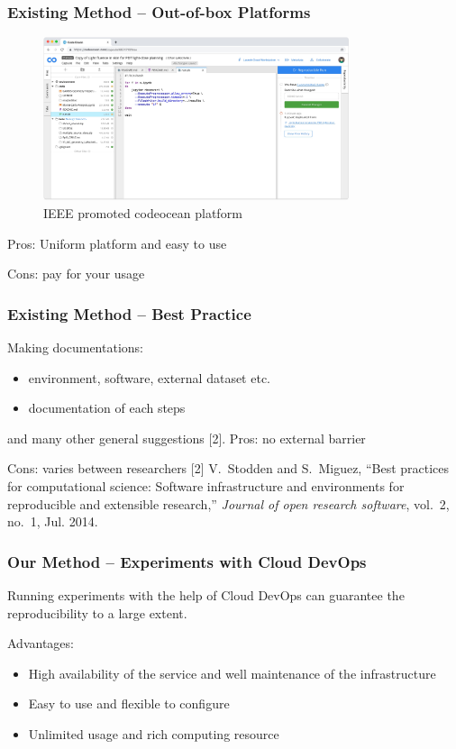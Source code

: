 \documentclass[notheorems]{beamer}
\begin{document}
\begin{frame}
\frametitle{Existing Method -- Out-of-box Platforms}

\begin{figure}
\includegraphics[width=0.8\textwidth]{pic/code_ocean.jpeg}
\caption{IEEE promoted codeocean platform}
\end{figure}
Pros: Uniform platform and easy to use

Cons: pay for your usage
\end{frame}

\begin{frame}
\frametitle{Existing Method -- Best Practice}

Making documentations:
\begin{itemize}
\item environment, software, external dataset etc.
\item documentation of each steps
\end{itemize}
and many other general suggestions [2].
\vskip 0.5cm
Pros: no external barrier

Cons: varies between researchers
\vskip 1cm
{\tiny
[2] V.~Stodden and S.~Miguez, ``Best practices for computational science: Software
  infrastructure and environments for reproducible and extensible research,''
  \emph{Journal of open research software}, vol.~2, no.~1, Jul. 2014.
  }
\end{frame}

\begin{frame}
\frametitle{Our Method -- Experiments with Cloud DevOps}
\begin{block}{}
\begin{centering}
Running experiments with the help of Cloud DevOps can guarantee the reproducibility to a large extent.
\end{centering}
\end{block}
Advantages:
\begin{itemize}
	\item High availability of the service and well maintenance of the infrastructure
	\item Easy to use and flexible to configure
	\item Unlimited usage and rich computing resource
\end{itemize}
\end{frame}
\end{document}
